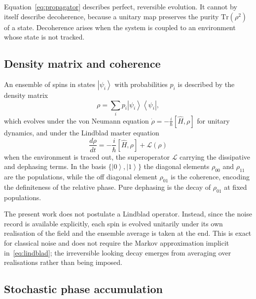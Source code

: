 \documentclass[conference]{IEEEtran}
\newcommand{\ket}[1]{\left|#1\right\rangle}
\newcommand{\bra}[1]{\left\langle#1\right|}
\begin{document}
Equation~\eqref{eq:propagator} describes perfect, reversible evolution. It cannot
by itself describe decoherence, because a unitary map preserves the purity
$\mathrm{Tr}(\rho^2)$ of a state. Decoherence arises when the system is coupled to
an environment whose state is not tracked.

\subsection{Density matrix and coherence}

An ensemble of spins in states $\ket{\psi_i}$ with probabilities $p_i$ is
described by the density matrix
\begin{equation}
\rho = \sum_i p_i \ket{\psi_i}\bra{\psi_i},
\end{equation}
which evolves under the von Neumann equation
$\dot{\rho} = -\tfrac{i}{\hbar}[\hat{H},\rho]$ for unitary dynamics, and under the
Lindblad master equation
\begin{equation}
\frac{d\rho}{dt} = -\frac{i}{\hbar}\left[\hat{H},\rho\right] + \mathcal{L}(\rho)
\label{eq:lindblad}
\end{equation}
when the environment is traced out, the superoperator $\mathcal{L}$ carrying the
dissipative and dephasing terms. In the basis $\{\ket{0},\ket{1}\}$ the diagonal
elements $\rho_{00}$ and $\rho_{11}$ are the populations, while the off diagonal
element $\rho_{01}$ is the coherence, encoding the definiteness of the relative
phase. Pure dephasing is the decay of $\rho_{01}$ at fixed populations.

The present work does not postulate a Lindblad operator. Instead, since the noise
record is available explicitly, each spin is evolved unitarily under its own
realisation of the field and the ensemble average is taken at the end. This is
exact for classical noise and does not require the Markov approximation implicit
in~\eqref{eq:lindblad}; the irreversible looking decay emerges from averaging over
realisations rather than being imposed.

\subsection{Stochastic phase accumulation}
\end{document}
